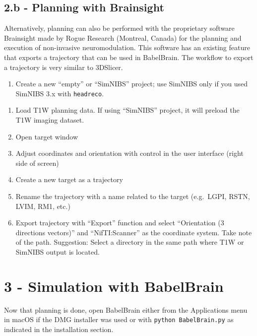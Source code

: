 \hypertarget{b---planning-with-brainsight}{%
\subsection{2.b - Planning with
Brainsight}\label{b---planning-with-brainsight}}

Alternatively, planning can also be performed with the proprietary
software Brainsight made by Rogue Research (Montreal, Canada) for the
planning and execution of non-invasive neuromodulation. This software
has an existing feature that exports a trajectory that can be used in
BabelBrain. The workflow to export a trajectory is very similar to
3DSlicer.

\begin{enumerate}
\def\labelenumi{\arabic{enumi}.}
\tightlist
\item
  Create a new ``empty'' or ``SimNIBS'' project; use SimNIBS only if you
  used SimNIBS 3.x with \texttt{headreco}.
\end{enumerate}

\begin{enumerate}
\def\labelenumi{\arabic{enumi}.}
\setcounter{enumi}{1}
\item
  Load T1W planning data. If using ``SimNIBS'' project, it will preload
  the T1W imaging dataset.
\item
  Open target window
\item
  Adjust coordinates and orientation with control in the user interface
  (right side of screen)
\item
  Create a new target as a trajectory
\item
  Rename the trajectory with a name related to the target (e.g.~LGPI,
  RSTN, LVIM, RM1, etc.)
\item
  Export trajectory with ``Export'' function and select ``Orientation (3
  directions vectors)'' and ``NifTI:Scanner'' as the coordinate system.
  Take note of the path. Suggestion: Select a directory in the same path
  where T1W or SimNIBS output is located.
\end{enumerate}

\hypertarget{simulation-with-babelbrain}{%
\section{3 - Simulation with
BabelBrain}\label{simulation-with-babelbrain}}

Now that planning is done, open BabelBrain either from the Applications
menu in macOS if the DMG installer was used or with
\texttt{python\ BabelBrain.py} as indicated in the installation section.

